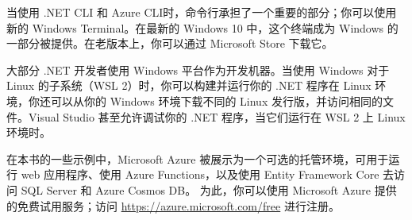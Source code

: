 当使用 .NET CLI 和 Azure CLI时，命令行承担了一个重要的部分；你可以使用新的 Windows Terminal。在最新的 Windows 10 中，这个终端成为 Windows 的一部分被提供。在老版本上，你可以通过 Microsoft Store 下载它。

大部分 .NET 开发者使用 Windows 平台作为开发机器。当使用 Windows 对于 Linux 的子系统（WSL 2）时，你可以构建并运行你的 .NET 程序在 Linux 环境，你还可以从你的 Windows 环境下载不同的 Linux 发行版，并访问相同的文件。Visual Studio 甚至允许调试你的 .NET 程序，当它们运行在 WSL 2 上 Linux 环境时。

在本书的一些示例中，Microsoft Azure 被展示为一个可选的托管环境，可用于运行 web 应用程序、使用 Azure Functions，以及使用 Entity Framework Core 去访问 SQL Server 和 Azure Cosmos DB。
为此，你可以使用 Microsoft Azure 提供的免费试用服务；访问 \url{https://azure.microsoft.com/free} 进行注册。